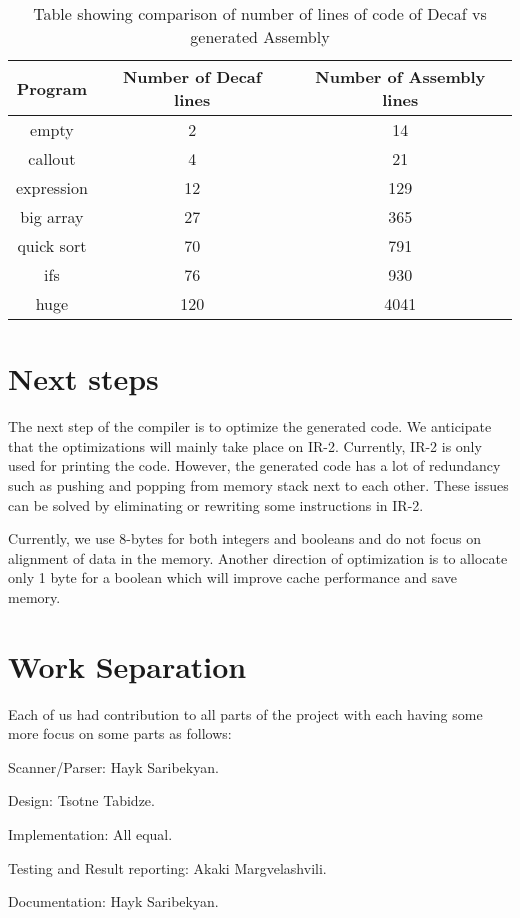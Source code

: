 \documentclass{article}[11pt]
\begin{document}
\begin{table}
\begin{tabular}{c|c|c}
    Program     & Number of Decaf lines & Number of Assembly lines  \\
    \hline
    empty       &   2           & 14                \\
    callout     &   4           & 21                \\
    expression  &   12          & 129               \\
    big array   &   27          & 365               \\
    quick sort  &   70          & 791               \\
    ifs         &   76          & 930               \\
    huge        &   120         & 4041               
\end{tabular}
\caption{Table showing comparison of number of lines of code of Decaf vs generated Assembly}
\label{tab:results}
\end{table}

\section{Next steps}
\label{sec:future}
The next step of the compiler is to optimize the generated code. We anticipate that the optimizations will mainly take place on IR-2. Currently, IR-2 is only used for printing the code. However, the generated code has a lot of redundancy such as pushing and popping from memory stack next to each other. These issues can be solved by eliminating or rewriting some instructions in IR-2.

Currently, we use 8-bytes for both integers and booleans and do not focus on alignment of data in the memory. Another direction of optimization is to allocate only 1 byte for a boolean which will improve cache performance and save memory.

\section{Work Separation}
\label{sec:work}
Each of us had contribution to all parts of the project with each having some more focus on some parts as follows:

Scanner/Parser: Hayk Saribekyan.

Design: Tsotne Tabidze.

Implementation: All equal.

Testing and Result reporting: Akaki Margvelashvili.

Documentation: Hayk Saribekyan.
\end{document}

